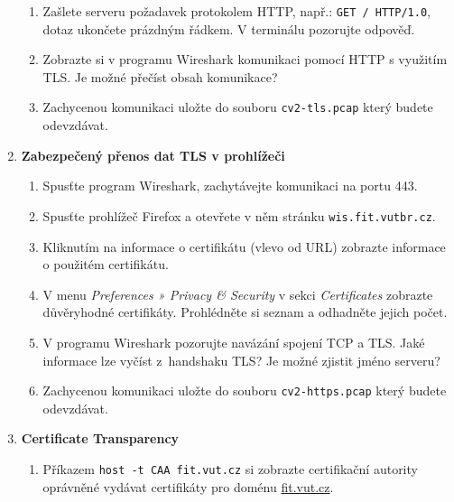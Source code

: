 \documentclass[a4paper,11pt]{article}
\begin{document}
\begin{enumerate}
\begin{enumerate}
      \item Zašlete serveru požadavek protokolem HTTP, např.:
        \verb|GET / HTTP/1.0|, dotaz ukončete prázdným řádkem.
        V terminálu pozorujte odpověď.

      \item Zobrazte si v programu Wireshark komunikaci pomocí HTTP s využitím TLS.
        Je možné přečíst obsah komunikace?

      \item Zachycenou komunikaci uložte do souboru {\tt cv2-tls.pcap} který budete odevzdávat.

    \end{enumerate}

  \item {\bf Zabezpečený přenos dat TLS v prohlížeči}

    \begin{enumerate}

      \item Spusťte program Wireshark, zachytávejte komunikaci na portu 443.

      \item Spusťte prohlížeč Firefox a otevřete v něm stránku \verb|wis.fit.vutbr.cz|.

      \item Kliknutím na informace o certifikátu (vlevo od URL) zobrazte informace o použitém certifikátu.

      \item V menu \emph{Preferences » Privacy \& Security} v sekci \emph{Certificates} zobrazte důvěryhodné certifikáty.
        Prohlédněte si seznam a odhadněte jejich počet.

      \item V programu Wireshark pozorujte navázání spojení TCP a TLS.
        Jaké informace lze vyčíst z~handshaku TLS?
        Je možné zjistit jméno serveru?

      \item Zachycenou komunikaci uložte do souboru {\tt cv2-https.pcap} který budete odevzdávat.

    \end{enumerate}

  \item {\bf Certificate Transparency}

    \begin{enumerate}

      \item Příkazem \verb|host -t CAA fit.vut.cz| si zobrazte certifikační autority oprávněné vydávat certifikáty pro doménu \url{fit.vut.cz}.


\end{enumerate}
\end{enumerate}
\end{document}
